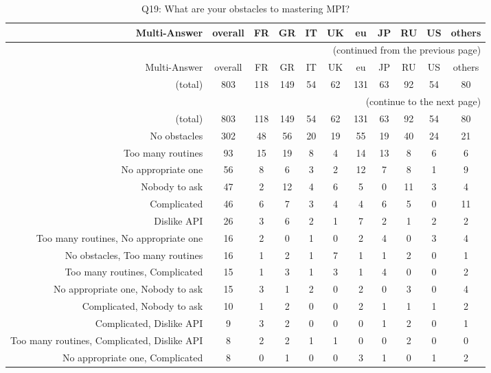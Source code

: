 \clearpage%
{\footnotesize\begin{landscape}%
\begin{longtable}[htb]{r|c|c|c|c|c|c|c|c|c|c}%
\caption{Q19: What are your obstacles to mastering MPI?}%
\label{tab:Q19-mans} \\%
\hline%
Multi-Answer & overall & FR & GR & IT & UK & eu & JP & RU & US & others \\
 \hline%
\endfirsthead%
\multicolumn{11}{r}{(continued from the previous page)}\\%
\hline%
Multi-Answer & overall & FR & GR & IT & UK & eu & JP & RU & US & others \\
 \hline%
\endhead%
\hline%
(total) & 803 & 118 & 149 & 54 & 62 & 131 & 63 & 92 & 54 & 80 \\%
\hline%
\multicolumn{11}{r}{(continue to the next page)}\\%
\endfoot%
\hline%
(total) & 803 & 118 & 149 & 54 & 62 & 131 & 63 & 92 & 54 & 80 \\%
\hline%
\endlastfoot%
\hline%
{No obstacles} & 302 & 48 & 56 & 20 & 19 & 55 & 19 & 40 & 24 & 21 \\%
{Too many routines} & 93 & 15 & 19 & 8 & 4 & 14 & 13 & 8 & 6 & 6 \\%
{No appropriate one} & 56 & 8 & 6 & 3 & 2 & 12 & 7 & 8 & 1 & 9 \\%
{Nobody to ask} & 47 & 2 & 12 & 4 & 6 & 5 & 0 & 11 & 3 & 4 \\%
{Complicated} & 46 & 6 & 7 & 3 & 4 & 4 & 6 & 5 & 0 & 11 \\%
{Dislike API} & 26 & 3 & 6 & 2 & 1 & 7 & 2 & 1 & 2 & 2 \\%
{Too many routines, No appropriate one} & 16 & 2 & 0 & 1 & 0 & 2 & 4 & 0 & 3 & 4 \\%
{No obstacles, Too many routines} & 16 & 1 & 2 & 1 & 7 & 1 & 1 & 2 & 0 & 1 \\%
{Too many routines, Complicated} & 15 & 1 & 3 & 1 & 3 & 1 & 4 & 0 & 0 & 2 \\%
{No appropriate one, Nobody to ask} & 15 & 3 & 1 & 2 & 0 & 2 & 0 & 3 & 0 & 4 \\%
{Complicated, Nobody to ask} & 10 & 1 & 2 & 0 & 0 & 2 & 1 & 1 & 1 & 2 \\%
{Complicated, Dislike API} & 9 & 3 & 2 & 0 & 0 & 0 & 1 & 2 & 0 & 1 \\%
{Too many routines, Complicated, Dislike API} & 8 & 2 & 2 & 1 & 1 & 0 & 0 & 2 & 0 & 0 \\%
{No appropriate one, Complicated} & 8 & 0 & 1 & 0 & 0 & 3 & 1 & 0 & 1 & 2 \\%

\end{longtable}
\end{landscape}}
